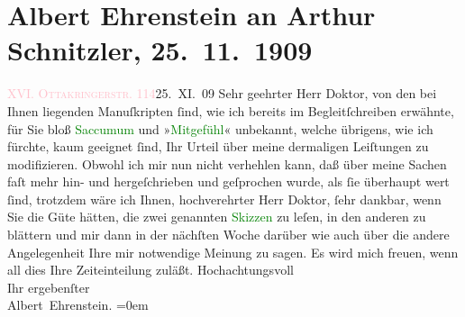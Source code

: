 

               \section[Albert Ehrenstein an Arthur Schnitzler, 25. 11. 1909]{ Albert Ehrenstein an Arthur Schnitzler, 25. 11. 1909}\nopagebreak{}\rehead{ }\normalsize\beginnumbering{} \toendnotes[C]{\smallbreak\pagebreak[2]} 
\toendnotes[C]{\smallbreak}\pstart
           {\pb}\textcolor{pink}{XVI. \textsc{Ottakringerstr}. 114}{}\ledrightnote{\textcolor{pink}{Ottakringerstraße}}\hfill 25. XI. 09\pend
           \pstart{}Sehr geehrter Herr Doktor,\pend\pstart
           von den bei Ihnen liegenden Manuſkripten ſind, wie ich bereits im
                    Begleitſchreiben erwähnte, für Sie bloß \textcolor{green}{Saccumum}{}\ledrightnote{\textcolor{green}{Saccumum}} und »\textcolor{green}{Mitgefühl}{}\ledrightnote{\textcolor{green}{Mitgefühl}}« unbekannt,
                    welche übrigens, wie ich fürchte, kaum geeignet ſind, Ihr Urteil über meine
                    dermaligen Leiſtungen zu modifizieren. Obwohl ich mir nun nicht verhehlen kann,
                    daß über meine Sachen faſt mehr hin- und hergeſchrieben und geſprochen wurde,
                    als {\pb}ſie überhaupt wert ſind, trotzdem wäre ich Ihnen,
                    hochverehrter Herr Doktor, ſehr dankbar, wenn Sie die Güte hätten, die zwei
                    genannten \textcolor{green}{Skizzen}{} zu
                    leſen, in den anderen zu blättern und mir dann in der nächſten Woche darüber wie
                    auch über die andere Angelegenheit Ihre mir notwendige Meinung zu sagen. Es wird
                    mich freuen, wenn all dies Ihre Zeiteinteilung zuläßt.\pend
           \pstart
           Hochachtungsvoll{\\[\baselineskip]}Ihr ergebenſter{\\[\baselineskip]}\spacefill\mbox{Albert Ehrenstein.}\pend
           \leftskip=0em{}\endnumbering{}  
      